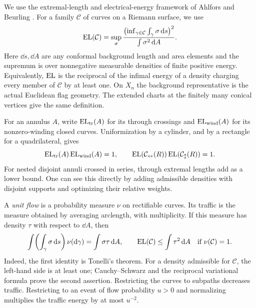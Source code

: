 We use the extremal-length and electrical-energy framework of
Ahlfors and Beurling \cite{AhlforsBeurling1952ConformalInvariants}.
For a family \(\mathcal C\) of curves on a Riemann surface, we use
\begin{equation}
 \EL(\mathcal C)=
 \sup_{\sigma}
 \frac{\bigl(\inf_{\gamma\in\mathcal C}
                 \int_\gamma\sigma\,\dd s\bigr)^2}
      {\int\sigma^2\,\dd A}.
 \label{conf:el-definition}
\end{equation}
Here \(\dd s,\dd A\) are any conformal background length and area
elements and the supremum is over nonnegative measurable densities of
finite positive energy.  Equivalently, \(\operatorname{EL}\) is the reciprocal of
the infimal energy of a density charging every member of \(\mathcal C\)
by at least one.  On \(X_n\) the background representative is the
actual Euclidean flag geometry.  The extended charts at the finitely
many conical vertices give the same definition.

For an annulus \(A\), write \(\operatorname{EL}_{\rm tr}(A)\) for its through
crossings and \(\operatorname{EL}_{\rm wind}(A)\) for its nonzero-winding closed
curves.  Uniformization by a cylinder, and by a rectangle for a
quadrilateral, gives
\begin{equation}
 \EL_{\rm tr}(A)\EL_{\rm wind}(A)=1,
 \qquad
 \EL(\mathcal C_{\leftrightarrow}(R))
 \EL(\mathcal C_{\updownarrow}(R))=1.
 \label{conf:duality}
\end{equation}
For nested disjoint annuli crossed in series, through extremal lengths
add as a lower bound.  One can see this directly by adding admissible
densities with disjoint supports and optimizing their relative weights.

A \emph{unit flow} is a probability measure \(\nu\) on rectifiable
curves.  Its traffic is the measure obtained by averaging arclength,
with multiplicity.  If this measure has density \(\tau\) with respect
to \(\dd A\), then
\begin{equation}
 \int\!\left(\int_\gamma\sigma\,\dd s\right)\nu(\dd\gamma)
   =\int\sigma\tau\,\dd A,
 \qquad
 \EL(\mathcal C)\le\int\tau^2\,\dd A
 \quad\hbox{if }\nu(\mathcal C)=1.
 \label{conf:flow-bound}
\end{equation}
Indeed, the first identity is Tonelli's theorem.  For a density
admissible for \(\mathcal C\), the left-hand side is at least one;
Cauchy--Schwarz and the reciprocal variational formula prove the second
assertion.  Restricting the curves to subpaths decreases traffic.
Restricting to an event of flow probability \(u>0\) and normalizing
multiplies the traffic energy by at most \(u^{-2}\).

